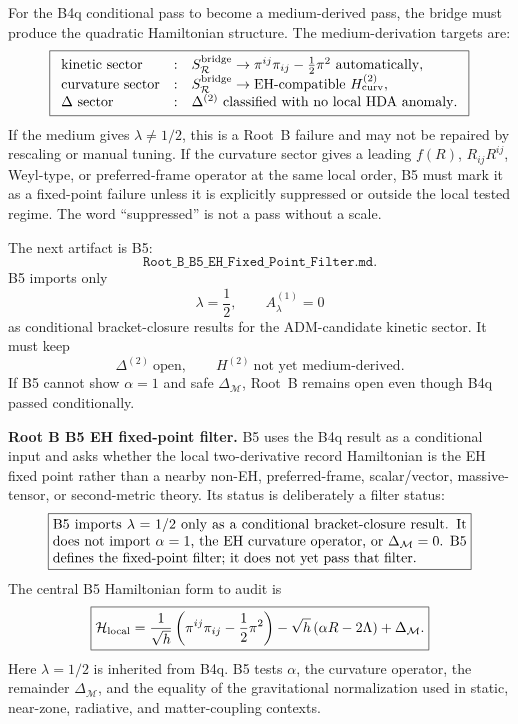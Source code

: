 \documentclass[11pt]{article}
\begin{document}
For the B4q conditional pass to become a medium-derived pass, the bridge must
produce the quadratic Hamiltonian structure.  The medium-derivation targets
are:
\[
\boxed{
\begin{array}{lll}
\text{kinetic sector} &:&
S_{\mathcal R}^{\rm bridge}\to
\pi^{ij}\pi_{ij}-\frac12\pi^2\ \text{automatically},\\
\text{curvature sector} &:&
S_{\mathcal R}^{\rm bridge}\to
\text{EH-compatible }H_{\rm curv}^{(2)},\\
\Delta\text{ sector} &:&
\Delta^{(2)}\ \text{classified with no local HDA anomaly}.
\end{array}}
\]
If the medium gives \(\lambda\ne1/2\), this is a Root~B failure and may not be
repaired by rescaling or manual tuning.  If the curvature sector gives a
leading \(f(R)\), \(R_{ij}R^{ij}\), Weyl-type, or preferred-frame operator at
the same local order, B5 must mark it as a fixed-point failure unless it is
explicitly suppressed or outside the local tested regime.  The word
``suppressed'' is not a pass without a scale.

The next artifact is B5:
\[
\boxed{\texttt{Root\_B\_B5\_EH\_Fixed\_Point\_Filter.md}.}
\]
B5 imports only
\[
\boxed{\lambda=\frac12,\qquad A_\lambda^{(1)}=0}
\]
as conditional bracket-closure results for the ADM-candidate kinetic sector.
It must keep
\[
\boxed{\Delta^{(2)}\ \text{open},\qquad
H^{(2)}\ \text{not yet medium-derived}.}
\]
If B5 cannot show \(\alpha=1\) and safe \(\Delta_{\mathcal M}\), Root~B remains
open even though B4q passed conditionally.

\medskip\noindent\textbf{Root B B5 EH fixed-point filter.}
B5 uses the B4q result as a conditional input and asks whether the local
two-derivative record Hamiltonian is the EH fixed point rather than a nearby
non-EH, preferred-frame, scalar/vector, massive-tensor, or second-metric
theory.  Its status is deliberately a filter status:
\[
\boxed{
\begin{minipage}{0.86\linewidth}
B5 imports \(\lambda=1/2\) only as a conditional bracket-closure result.  It
does not import \(\alpha=1\), the EH curvature operator, or
\(\Delta_{\mathcal M}=0\).  B5 defines the fixed-point filter; it does not yet
pass that filter.
\end{minipage}}
\]
The central B5 Hamiltonian form to audit is
\[
\boxed{
{\cal H}_{\rm local}
=\frac{1}{\sqrt h}\left(\pi^{ij}\pi_{ij}-\frac12\pi^2\right)
-\sqrt h\,(\alpha R-2\Lambda)+\Delta_{\mathcal M}.
}
\]
Here \(\lambda=1/2\) is inherited from B4q.  B5 tests \(\alpha\), the
curvature operator, the remainder \(\Delta_{\mathcal M}\), and the equality of
the gravitational normalization used in static, near-zone, radiative, and
matter-coupling contexts.
\end{document}
